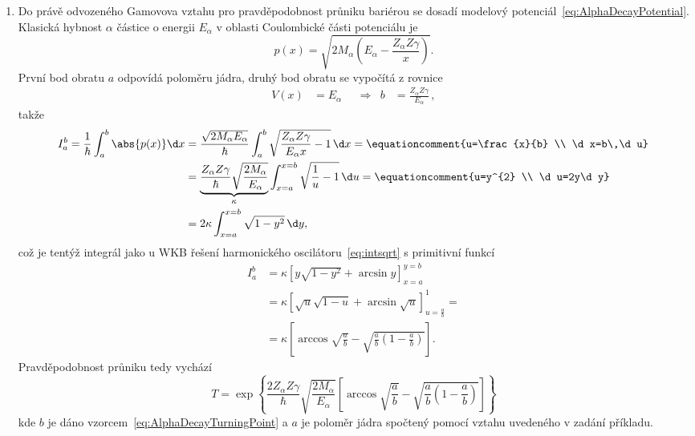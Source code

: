 \begin{solution}
\begin{enumerate}
	\item
		Do právě odvozeného Gamovova vztahu pro pravděpodobnost průniku bariérou se dosadí modelový potenciál~\eqref{eq:AlphaDecayPotential}.
		Klasická hybnost $\alpha$ částice o energii $E_{\alpha}$ v oblasti Coulombické části potenciálu je
		\begin{equation}
			p(x)=\sqrt{2M_{\alpha}\left(E_{\alpha}-\frac{Z_{\alpha}Z\gamma}{x}\right)}.
		\end{equation}
		První bod obratu $a$ odpovídá poloměru jádra, druhý bod obratu se vypočítá z rovnice
		\begin{align}
			\label{eq:AlphaDecayTurningPoint}
			V(x)&=E_{\alpha} && \Longrightarrow & b&=\frac{Z_{\alpha}Z\gamma}{E_{\alpha}}\,,
		\end{align}
		takže
		\begin{align}
			I_{a}^{b}=\frac{1}{\hbar}\int_{a}^{b}\abs{p(x)}\d x
				&=\frac{\sqrt{2M_{\alpha}E_{\alpha}}}{\hbar}\int_{a}^{b}\sqrt{\frac{Z_{\alpha}Z\gamma}{E_{\alpha}x}-1}\,\d x=\equationcomment{u=\frac{x}{b} \\ \d x=b\,\d u}\nonumber\\
				&=\underbrace{\frac{Z_{\alpha}Z\gamma}{\hbar}\sqrt{\frac{2M_{\alpha}}{E_{\alpha}}}}_{\kappa}\int_{x=a}^{x=b}\sqrt{\frac{1}{u}-1}\,\d u=\equationcomment{u=y^{2} \\ \d u=2y\d y}\nonumber\\				
				&=2\kappa\int_{x=a}^{x=b}\sqrt{1-y^{2}}\,\d y,
		\end{align}
		což je tentýž integrál jako u WKB řešení harmonického oscilátoru~\eqref{eq:intsqrt} s primitivní funkcí
		\begin{align}
			I_{a}^{b}
				&=\kappa\left[y\sqrt{1-y^{2}}+\arcsin{y}\right]_{x=a}^{y=b}\nonumber\\
				&=\kappa\left[\sqrt{u}\sqrt{1-u}+\arcsin{\sqrt{u}}\right]_{u=\frac{a}{b}}^{1}=\nonumber\\
				&=\kappa\left[\arccos{\sqrt{\frac{a}{b}}}-\sqrt{\frac{a}{b}\left(1-\frac{a}{b}\right)}\right].
		\end{align}
		Pravděpodobnost průniku tedy vychází
		\begin{equation}
			T=\exp{\left\{\frac{2Z_{\alpha}Z\gamma}{\hbar}\sqrt{\frac{2M_{\alpha}}{E_{\alpha}}}\left[\arccos{\sqrt{\frac{a}{b}}}-\sqrt{\frac{a}{b}\left(1-\frac{a}{b}\right)}\right]\right\}}
		\end{equation}
		kde $b$ je dáno vzorcem~\eqref{eq:AlphaDecayTurningPoint} a $a$ je poloměr jádra spočtený pomocí vztahu uvedeného v zadání příkladu.
		

\end{enumerate}
\end{solution}
